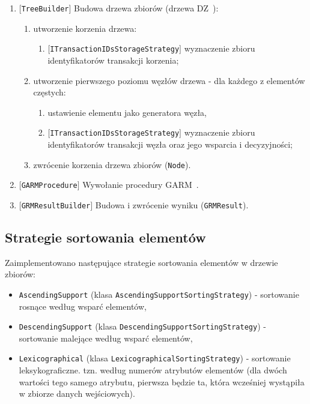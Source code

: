 \documentclass[a4paper,10pt]{article}
\begin{document}
\begin{enumerate}
  \item $[$\verb+TreeBuilder+$]$ Budowa drzewa zbiorów (drzewa DZ~\cite{grm}):
   \begin{enumerate}
    \item utworzenie korzenia drzewa:
     \begin{enumerate}
      \item $[$\verb+ITransactionIDsStorageStrategy+$]$ wyznaczenie zbioru identyfikatorów transakcji korzenia;
     \end{enumerate} 
    \item utworzenie pierwszego poziomu węzłów drzewa - dla każdego z elementów częstych:
     \begin{enumerate}
      \item ustawienie elementu jako generatora węzła,
      \item $[$\verb+ITransactionIDsStorageStrategy+$]$ wyznaczenie zbioru identyfikatorów transakcji węzła oraz jego wsparcia i decyzyjności;
     \end{enumerate}
    \item zwrócenie korzenia drzewa zbiorów (\verb+Node+).
   \end{enumerate}

  \item $[$\verb+GARMProcedure+$]$ Wywołanie procedury GARM~\cite{grm}.
  
  \item $[$\verb+GRMResultBuilder+$]$ Budowa i zwrócenie wyniku (\verb+GRMResult+).
 \end{enumerate}

 
 \subsection{Strategie sortowania elementów} \label{sec:impl:sort}
 Zaimplementowano następujące strategie sortowania elementów w drzewie zbiorów:
 
 \begin{itemize}
  \item \verb+AscendingSupport+ (klasa \verb+AscendingSupportSortingStrategy+) - sortowanie rosnące według wsparć elementów,
  \item \verb+DescendingSupport+ (klasa \verb+DescendingSupportSortingStrategy+) - sortowanie malejące według wsparć elementów,
  \item \verb+Lexicographical+ (klasa \verb+LexicographicalSortingStrategy+) - sortowanie leksykograficzne. tzn. według numerów atrybutów elementów (dla dwóch wartości tego samego atrybutu, pierwsza będzie ta, która wcześniej wystąpiła w zbiorze danych wejściowych).
 \end{itemize}
 
\end{document}
